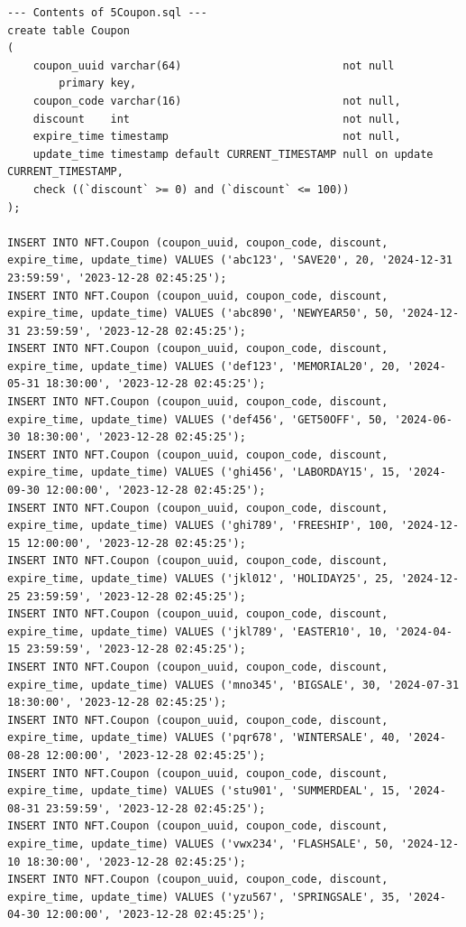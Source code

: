 \documentclass[a4paper, 12pt]{article}
\begin{document}
\begin{lstlisting}
--- Contents of 5Coupon.sql ---
create table Coupon
(
    coupon_uuid varchar(64)                         not null
        primary key,
    coupon_code varchar(16)                         not null,
    discount    int                                 not null,
    expire_time timestamp                           not null,
    update_time timestamp default CURRENT_TIMESTAMP null on update CURRENT_TIMESTAMP,
    check ((`discount` >= 0) and (`discount` <= 100))
);

INSERT INTO NFT.Coupon (coupon_uuid, coupon_code, discount, expire_time, update_time) VALUES ('abc123', 'SAVE20', 20, '2024-12-31 23:59:59', '2023-12-28 02:45:25');
INSERT INTO NFT.Coupon (coupon_uuid, coupon_code, discount, expire_time, update_time) VALUES ('abc890', 'NEWYEAR50', 50, '2024-12-31 23:59:59', '2023-12-28 02:45:25');
INSERT INTO NFT.Coupon (coupon_uuid, coupon_code, discount, expire_time, update_time) VALUES ('def123', 'MEMORIAL20', 20, '2024-05-31 18:30:00', '2023-12-28 02:45:25');
INSERT INTO NFT.Coupon (coupon_uuid, coupon_code, discount, expire_time, update_time) VALUES ('def456', 'GET50OFF', 50, '2024-06-30 18:30:00', '2023-12-28 02:45:25');
INSERT INTO NFT.Coupon (coupon_uuid, coupon_code, discount, expire_time, update_time) VALUES ('ghi456', 'LABORDAY15', 15, '2024-09-30 12:00:00', '2023-12-28 02:45:25');
INSERT INTO NFT.Coupon (coupon_uuid, coupon_code, discount, expire_time, update_time) VALUES ('ghi789', 'FREESHIP', 100, '2024-12-15 12:00:00', '2023-12-28 02:45:25');
INSERT INTO NFT.Coupon (coupon_uuid, coupon_code, discount, expire_time, update_time) VALUES ('jkl012', 'HOLIDAY25', 25, '2024-12-25 23:59:59', '2023-12-28 02:45:25');
INSERT INTO NFT.Coupon (coupon_uuid, coupon_code, discount, expire_time, update_time) VALUES ('jkl789', 'EASTER10', 10, '2024-04-15 23:59:59', '2023-12-28 02:45:25');
INSERT INTO NFT.Coupon (coupon_uuid, coupon_code, discount, expire_time, update_time) VALUES ('mno345', 'BIGSALE', 30, '2024-07-31 18:30:00', '2023-12-28 02:45:25');
INSERT INTO NFT.Coupon (coupon_uuid, coupon_code, discount, expire_time, update_time) VALUES ('pqr678', 'WINTERSALE', 40, '2024-08-28 12:00:00', '2023-12-28 02:45:25');
INSERT INTO NFT.Coupon (coupon_uuid, coupon_code, discount, expire_time, update_time) VALUES ('stu901', 'SUMMERDEAL', 15, '2024-08-31 23:59:59', '2023-12-28 02:45:25');
INSERT INTO NFT.Coupon (coupon_uuid, coupon_code, discount, expire_time, update_time) VALUES ('vwx234', 'FLASHSALE', 50, '2024-12-10 18:30:00', '2023-12-28 02:45:25');
INSERT INTO NFT.Coupon (coupon_uuid, coupon_code, discount, expire_time, update_time) VALUES ('yzu567', 'SPRINGSALE', 35, '2024-04-30 12:00:00', '2023-12-28 02:45:25');



\end{lstlisting}
\end{document}
